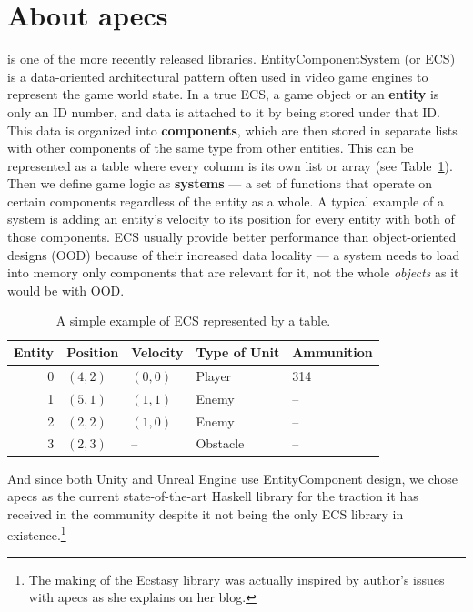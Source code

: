 \documentclass[
  digital, %
  color,   %
  table,   %
  oneside, %
  lof,     %
  lot,     %
]{fithesis3}
\begin{document}
\section{About apecs}
\label{sect:apecs}
\cite{apecsrepo}
is one of the more recently released libraries.
Entity\textendash{}Component\textendash{}System (or ECS) is a data-oriented architectural pattern often
used in video game engines to represent the game world state.
In a true ECS, a game object or an \textbf{entity} is only an ID number,
and data is attached to it by being stored under that ID. This data is
organized into \textbf{components}, which are then stored in separate
lists with other components of the same type from other entities.\cite{mediumecs} This can
be represented as a table where every column is its own list or array
(see Table~\ref{tab:ecsexamp}). Then we define game logic as \textbf{systems}
--- a set of functions that operate on certain components regardless of the
entity as a whole. A typical example of a system is adding an entity's velocity
to its position for every entity with both of those components.
ECS usually provide better performance than object-oriented designs (OOD)
because of their increased data locality --- a system needs to load into memory
only components that are relevant for it, not the whole \emph{objects}
as it would be with OOD.\cite{apecspaper}
\begin{table}[htp]
  \begin{tabularx}{320pt}{|r|lllX|}
    \toprule
    Entity & Position & Velocity & Type of Unit & Ammunition \\
    \midrule
    0 & $(4,2)$ & $(0,0)$ & Player   & 314\\
    1 & $(5,1)$ & $(1,1)$ & Enemy    & -- \\
    2 & $(2,2)$ & $(1,0)$ & Enemy    & -- \\
    3 & $(2,3)$ & --      & Obstacle & -- \\
    \bottomrule
  \end{tabularx}
  \caption{A simple example of ECS represented by a table.}
  \label{tab:ecsexamp}
\end{table}

And since both Unity and Unreal Engine use Entity\textendash{}Component design,
we chose apecs as the current state-of-the-art Haskell library
for the traction it has received in the community despite
it not being the only ECS library in existence.\footnote{
The making of the Ecstasy library was actually inspired by
author's issues with apecs as she explains on her blog.\cite{whyecstasy}
}
\end{document}

